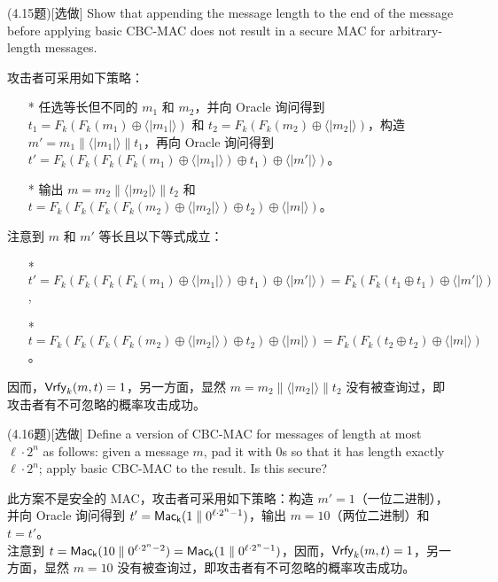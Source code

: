 \begin{questions}
    \question (4.15题)[选做] Show that appending the message length to the end of the message before applying basic CBC-MAC does not result in a secure MAC for arbitrary-length messages.

        \begin{solution}
            \newline
            攻击者可采用如下策略：
            \begin{enumerate}
                \item[*] 任选等长但不同的 $m_1$ 和 $m_2$，并向 Oracle 询问得到 $t_1=F_k(F_k(m_1)\oplus\langle{|m_1|}\rangle)$ 和 $t_2=F_k(F_k(m_2)\oplus\langle{|m_2|}\rangle)$，构造 $m'=m_1\parallel\langle{|m_1|}\rangle\parallel{t_1}$，再向 Oracle 询问得到 $t'=F_k(F_k(F_k(F_k(m_1)\oplus\langle{|m_1|}\rangle)\oplus{t_1})\oplus\langle{|m'|}\rangle)$。
                \item[*] 输出 $m=m_2\parallel\langle{|m_2|}\rangle\parallel{t_2}$ 和 $t=F_k(F_k(F_k(F_k(m_2)\oplus\langle{|m_2|}\rangle)\oplus{t_2})\oplus\langle{|m|}\rangle)$。
            \end{enumerate}
            注意到 $m$ 和 $m'$ 等长且以下等式成立：
            \begin{enumerate}
                \item[*] $t'=F_k(F_k(F_k(F_k(m_1)\oplus\langle{|m_1|}\rangle)\oplus{t_1})\oplus\langle{|m'|}\rangle)=F_k(F_k(t_1\oplus{t_1})\oplus\langle{|m'|}\rangle)$,
                \item[*] $t=F_k(F_k(F_k(F_k(m_2)\oplus\langle{|m_2|}\rangle)\oplus{t_2})\oplus\langle{|m|}\rangle)=F_k(F_k(t_2\oplus{t_2})\oplus\langle{|m|}\rangle)$。
            \end{enumerate}
            因而，$\mathsf{Vrfy}_k(m,t)=1$，另一方面，显然 $m=m_2\parallel\langle{|m_2|}\rangle\parallel{t_2}$ 没有被查询过，即攻击者有不可忽略的概率攻击成功。
        \end{solution}

    \question (4.16题)[选做] Define a version of CBC-MAC for messages of length at most $\ell\cdot{2^n}$ as follows: given a message $m$, pad it with $0$s so that it has length exactly $\ell\cdot{2^n}$; apply basic CBC-MAC to the result. Is this secure?

        \begin{solution}
            \newline
            此方案不是安全的 MAC，攻击者可采用如下策略：构造 $m'=1$（一位二进制），并向 Oracle 询问得到 $t'=\mathsf{Mac_k}(1\parallel{0^{\ell\cdot2^n-1}})$，输出 $m=10$（两位二进制）和 $t=t'$。\\
            注意到 $t=\mathsf{Mac_k}(10\parallel{0^{\ell\cdot2^n-2}})=\mathsf{Mac_k}(1\parallel{0^{\ell\cdot2^n-1}})$，因而，$\mathsf{Vrfy}_k(m,t)=1$，另一方面，显然 $m=10$ 没有被查询过，即攻击者有不可忽略的概率攻击成功。
        \end{solution}


\end{questions}
